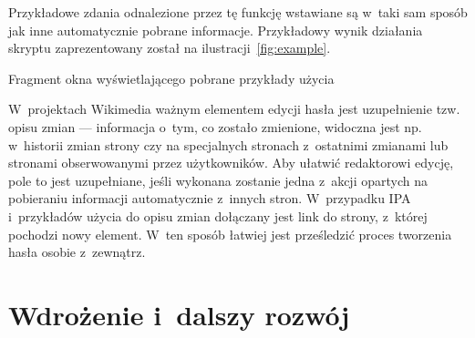 Przykładowe zdania odnalezione przez tę funkcję wstawiane są w~taki sam sposób jak inne automatycznie pobrane informacje. Przykładowy wynik działania skryptu zaprezentowany został na ilustracji~\ref{fig:example}.

\begin{illustration}
	\caption{Fragment okna wyświetlającego pobrane przykłady użycia}
	\label{fig:example}
\end{illustration}

W~projektach Wikimedia ważnym elementem edycji hasła jest uzupełnienie tzw. opisu zmian --- informacja o~tym, co zostało zmienione, widoczna jest np. w~historii zmian strony czy na specjalnych stronach z~ostatnimi zmianami lub stronami obserwowanymi przez użytkowników. Aby ułatwić redaktorowi edycję, pole to jest uzupełniane, jeśli wykonana zostanie jedna z~akcji opartych na pobieraniu informacji automatycznie z~innych stron. W~przypadku IPA i~przykładów użycia do opisu zmian dołączany jest link do strony, z~której pochodzi nowy element. W~ten sposób łatwiej jest prześledzić proces tworzenia hasła osobie z~zewnątrz.

\section{Wdrożenie i~dalszy rozwój}
\label{sec:impl-deploy}


